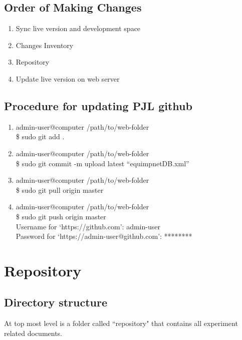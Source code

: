 \documentclass[justified]{book}
\begin{document}
\subsection{Order of Making Changes}
\begin{enumerate}
\item Sync live version and development space
\item Changes Inventory
\item Repository
\item Update live version on web server

\end{enumerate}

\subsection{Procedure for updating PJL github}\label{proc:sync}


\begin{enumerate}
\item admin-user@computer /path/to/web-folder\\
	\$ sudo git add .
\item admin-user@computer /path/to/web-folder\\
	\$ sudo git commit -m upload latest ``equimpnetDB.xml''
\item admin-user@computer /path/to/web-folder\\
	\$ sudo git pull origin master
\item admin-user@computer /path/to/web-folder\\
	\$ sudo git push origin master\\
	Username for `https://github.com': admin-user\\
	Password for `https://admin-user@github.com': ********
\end{enumerate}


\section{Repository}

\subsection{Directory structure}

At top most level is a folder called ``repository" that contains all experiment related documents.\\
\end{document}
